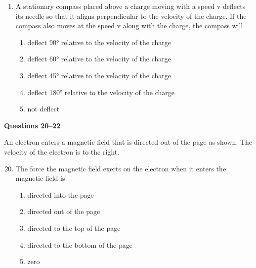 \documentclass[11pt]{article}
\begin{document}
\begin{multicols}{2}
\begin{enumerate}[leftmargin=18pt]
  \item A stationary compass placed above a charge moving with a speed v
    deflects its needle so that it aligns perpendicular to the velocity of the
    charge. If the compass also moves at the speed v along with the charge,
    the compass will
    \begin{enumerate}[noitemsep,topsep=0pt,leftmargin=18pt,label=(\Alph*)]
    \item deflect \ang{90} relative to the velocity of the charge
    \item deflect \ang{60} relative to the velocity of the charge
    \item deflect \ang{45} relative to the velocity of the charge
    \item deflect \ang{180} relative to the velocity of the charge
    \item not deflect
    \end{enumerate}    
  \end{enumerate}


  \textbf{Questions 20--22}
  
  An electron enters a magnetic field that is directed out of the page as shown.
  The velocity of the electron is to the right.
  \begin{center}
  \end{center}

  \begin{enumerate}[leftmargin=18pt]
    \setcounter{enumi}{19}
  \item The force the magnetic field exerts on the electron when it enters the
    magnetic field is
    \begin{enumerate}[noitemsep,topsep=0pt,leftmargin=18pt,label=(\Alph*)]
    \item directed into the page
    \item directed out of the page
    \item directed to the top of the page
    \item directed to the bottom of the page
    \item zero
    \end{enumerate}


\end{enumerate}
\end{multicols}
\end{document}
